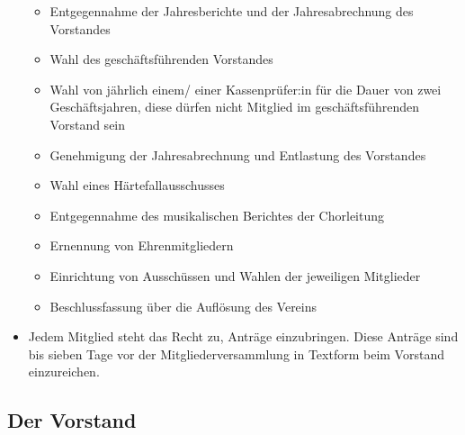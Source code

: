 \documentclass[12pt,paper=a4,ngerman]{report}
\begin{document}
\begin{itemize}
\begin{itemize}
        \item Entgegennahme der Jahresberichte und der Jahresabrechnung des Vorstandes
        \item Wahl des geschäftsführenden Vorstandes
        \item Wahl von jährlich einem/ einer Kassenprüfer:in für die Dauer von zwei Geschäftsjahren, diese dürfen nicht Mitglied im geschäftsführenden Vorstand sein
        \item Genehmigung der Jahresabrechnung und Entlastung des Vorstandes
        \item Wahl eines Härtefallausschusses
        \item Entgegennahme des musikalischen Berichtes der Chorleitung
        \item Ernennung von Ehrenmitgliedern
        \item Einrichtung von Ausschüssen und Wahlen der jeweiligen Mitglieder
        \item Beschlussfassung über die Auflösung des Vereins
    \end{itemize}
    \item Jedem Mitglied steht das Recht zu, Anträge einzubringen. Diese Anträge sind bis sieben Tage vor der Mitgliederversammlung in Textform beim Vorstand einzureichen.

\end{itemize}

\subsection{Der Vorstand}
\end{document}
